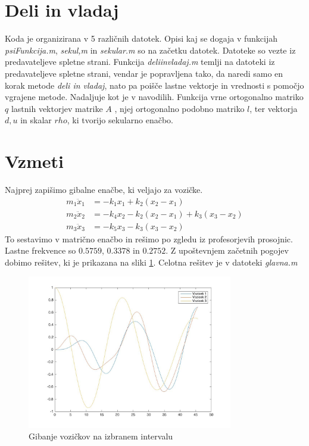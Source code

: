 \documentclass[a4paper,12pt]{article}
\begin{document}
\section{Deli in vladaj}
Koda je organizirana v 5 različnih datotek. Opisi kaj se dogaja v funkcijah \emph{psiFunkcija.m}, \emph{sekul,m} in \emph{sekular.m} so na začetku datotek. Datoteke so vezte iz predavateljeve spletne strani.  Funkcija \emph{deliinvladaj.m} temlji na datoteki iz predavateljeve spletne strani, vendar je popravljena tako, da naredi samo en korak metode \emph{deli in vladaj}, nato pa poišče lastne vektorje in vrednosti s pomočjo vgrajene metode. Nadaljuje kot je v navodilih. Funkcija vrne ortogonalno matriko $q$ lastnih vektorjev matrike $A$ , njej ortogonalno podobno matriko $l$, ter vektorja $d, u$ in skalar $rho$, ki tvorijo sekularno enačbo. 

\section{Vzmeti}
Najprej zapišimo gibalne enačbe, ki veljajo za vozičke. 
\begin{align*}
	m_1\ddot{x}_1 &= -k_1x_1 + k_2(x_2-x_1) \\
	m_2\ddot{x}_2 &= -k_4x_2 - k_2(x_2-x_1)+ k_3(x_3-x_2) \\
	m_3\ddot{x}_3 &= -k_5x_3 - k_3(x_3-x_2)
\end{align*}
To sestavimo v matrično enačbo in rešimo po zgledu iz profesorjevih prosojnic. Lastne frekvence so  $0.5759$, $0.3378$ in $0.2752$. Z upoštevnjem začetnih pogojev dobimo rešitev, ki je prikazana na sliki \ref{vozicki}. Celotna rešitev je v datoteki \emph{glavna.m}


\begin{figure}[h]
	\centering
	\caption{Gibanje vozičkov na izbranem intervalu}
	\label{vozicki}
	\includegraphics[width=0.80\textwidth]{vozicki.jpg}
\end{figure}
 
\end{document}

